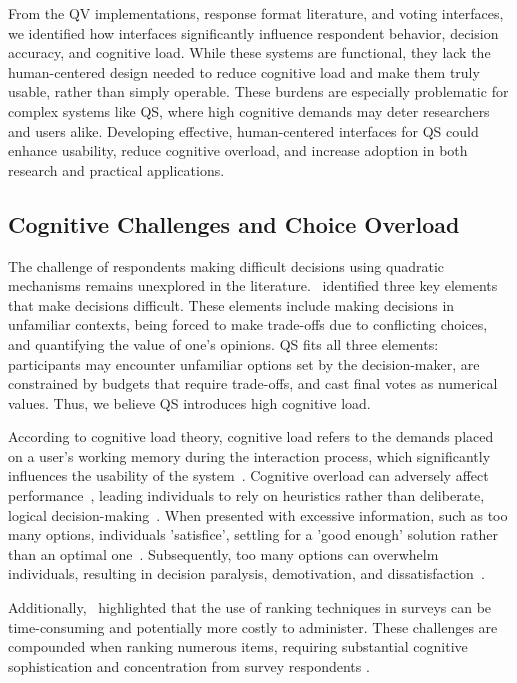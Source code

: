From the QV implementations, response format literature, and voting interfaces, we identified how interfaces significantly influence respondent behavior, decision accuracy, and cognitive load. While these systems are functional, they lack the human-centered design needed to reduce cognitive load and make them truly usable, rather than simply operable. These burdens are especially problematic for complex systems like QS, where high cognitive demands may deter researchers and users alike. Developing effective, human-centered interfaces for QS could enhance usability, reduce cognitive overload, and increase adoption in both research and practical applications.

\subsection{Cognitive Challenges and Choice Overload}
The challenge of respondents making difficult decisions using quadratic mechanisms remains unexplored in the literature.~\textcite{lichtensteinConstructionPreference2006} identified three key elements that make decisions difficult. These elements include making decisions in unfamiliar contexts, being forced to make trade-offs due to conflicting choices, and quantifying the value of one's opinions. QS fits all three elements: participants may encounter unfamiliar options set by the decision-maker, are constrained by budgets that require trade-offs, and cast final votes as numerical values. Thus, we believe QS introduces high cognitive load.

According to cognitive load theory, cognitive load refers to the demands placed on a user's working memory during the interaction process, which significantly influences the usability of the system~\cite{cooper1998research, seppCognitiveLoadTheory2019}. Cognitive overload can adversely affect performance~\cite{drommi2001interface}, leading individuals to rely on heuristics rather than deliberate, logical decision-making~\cite{daniel2017thinking}. When presented with excessive information, such as too many options, individuals 'satisfice', settling for a 'good enough' solution rather than an optimal one~\cite{simonBehavioralModelRational1955, payneAdaptiveStrategySelection1988, tverskyJudgmentsRepresentativeness}. Subsequently, too many options can overwhelm individuals, resulting in decision paralysis, demotivation, and dissatisfaction~\cite{iyengarWhenChoiceDemotivating2000}.

Additionally,~\textcite{alwinMeasurementValuesSurveys1985} highlighted that the use of ranking techniques in surveys can be time-consuming and potentially more costly to administer. These challenges are compounded when ranking numerous items, requiring substantial cognitive sophistication and concentration from survey respondents \cite{featherMeasurementValuesEffects1973}.


